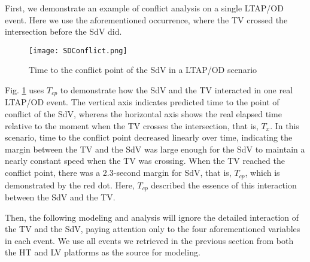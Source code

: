 \documentclass[letterpaper, 10 pt, conference]{ieeeconf}
\begin{document}
First, we demonstrate an example of conflict analysis on a single LTAP/OD event. Here we use the aforementioned occurrence, where the TV crossed the intersection before the SdV did.
    \begin{figure}
    \texttt{[image: SDConflict.png]}
    \caption{Time to the conflict point of the SdV in a LTAP/OD scenario}
    \label{fig:SDConflict}
    \end{figure}
Fig. \ref{fig:SDConflict} uses $T_{cp}$ to demonstrate how the SdV and the TV interacted in one real LTAP/OD event. The vertical axis indicates predicted time to the point of conflict of the SdV, whereas the horizontal axis shows the real elapsed time relative to the moment when the TV crosses the intersection, that is, $T_x$.
In this scenario, time to the conflict point decreased linearly over time, indicating the margin between the TV and the SdV was large enough for the SdV to maintain a nearly constant speed when the TV was crossing. When the TV reached the conflict point, there was a 2.3-second margin for SdV, that is, $T_{cp}$, which is demonstrated by the red dot. Here, $T_{cp}$ described the essence of this interaction between the SdV and the TV.

Then, the following modeling and analysis will ignore the detailed interaction of the TV and the SdV, paying attention only to the four aforementioned variables in each event. We use all events we retrieved in the previous section from both the HT and LV platforms as the source for modeling.

 
\end{document}
